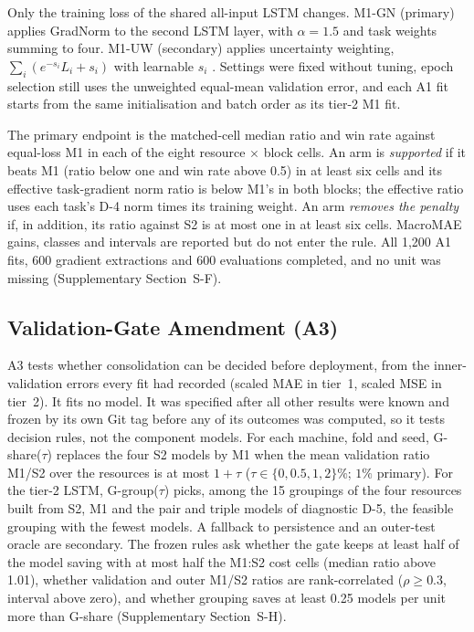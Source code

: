 \documentclass[5p,twocolumn]{elsarticle}
\begin{document}
Only the training loss of the shared all-input LSTM changes. M1-GN (primary)
applies GradNorm \citep{Chen2018GradNorm} to the second LSTM layer, with
$\alpha=1.5$ and task weights summing to four. M1-UW (secondary) applies
uncertainty weighting, $\sum_i (e^{-s_i}L_i+s_i)$ with learnable $s_i$
\citep{Kendall2018Uncertainty}. Settings were fixed without tuning, epoch
selection still uses the unweighted equal-mean validation error, and each A1
fit starts from the same initialisation and batch order as its tier-2 M1 fit.

The primary endpoint is the matched-cell median ratio and win rate against
equal-loss M1 in each of the eight resource $\times$ block cells. An arm is
\emph{supported} if it beats M1 (ratio below one and win rate above 0.5) in
at least six cells and its effective task-gradient norm ratio is below M1's
in both blocks; the effective ratio uses each task's D-4 norm times its
training weight. An arm \emph{removes the penalty} if, in addition, its ratio
against S2 is at most one in at least six cells. MacroMAE gains, classes and
intervals are reported but do not enter the rule. All 1{,}200 A1 fits, 600
gradient extractions and 600 evaluations completed, and no unit was missing
(Supplementary Section~S-F).

\subsection{Validation-Gate Amendment (A3)}
\label{sec:a3-design}

A3 tests whether consolidation can be decided before deployment, from the
inner-validation errors every fit had recorded (scaled MAE in tier~1, scaled
MSE in tier~2). It fits no model. It was specified after all other results
were known and frozen by its own Git tag before any of its outcomes was
computed, so it tests decision rules, not the component models. For each
machine, fold and seed, G-share($\tau$) replaces the four S2 models by M1 when
the mean validation ratio M1/S2 over the resources is at most $1+\tau$
($\tau\in\{0,0.5,1,2\}\%$; $1\%$ primary). For the tier-2 LSTM, G-group($\tau$)
picks, among the 15 groupings of the four resources built from S2, M1 and the
pair and triple models of diagnostic D-5, the feasible grouping with the
fewest models. A fallback to persistence and an outer-test oracle are
secondary. The frozen rules ask whether the gate keeps at least half of the
model saving with at most half the M1:S2 cost cells (median ratio above
1.01), whether validation and outer M1/S2 ratios are rank-correlated
($\rho\geq0.3$, interval above zero), and whether grouping saves at least 0.25
models per unit more than G-share (Supplementary Section~S-H).
\end{document}
